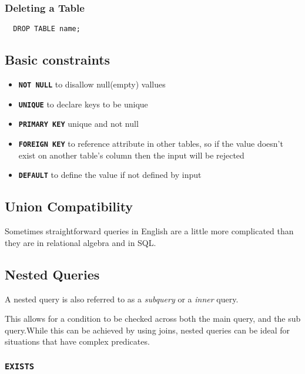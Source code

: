 \documentclass{article}
\begin{document}
\subsubsection*{Deleting a Table}

\begin{lstlisting}
  DROP TABLE name;
\end{lstlisting}


\subsection{Basic constraints}
\begin{itemize}
  \item \texttt{\textbf{NOT NULL}} to disallow null(empty) vallues
  \item \texttt{\textbf{UNIQUE}} to declare keys to be unique
  \item \texttt{\textbf{PRIMARY KEY}} unique and not null
  \item \texttt{\textbf{FOREIGN KEY}} to reference attribute in other tables, so if the value doesn't exist on another table's column then the input will be rejected
  \item \texttt{\textbf{DEFAULT}} to define the value if not defined by input
\end{itemize}


\subsection{Union Compatibility}

Sometimes straightforward queries in English are a little more complicated than they are in relational algebra and in SQL.

\subsection{Nested Queries}

A nested query is also referred to as a \textit{subquery} or a \textit{inner} query.

This allows for a condition to be checked across both the main query, and the sub query.While this can be achieved by using joins, nested queries can be ideal for situations that have complex predicates.

\subsubsection*{\texttt{EXISTS}}
\end{document}
